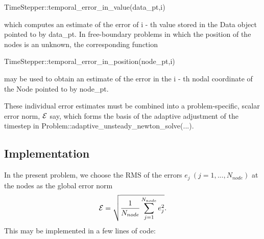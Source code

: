 \begin{DoxyCode}
TimeStepper::temporal\_error\_in\_value(data\_pt,i)
\end{DoxyCode}


which computes an estimate of the error of {\ttfamily i} -\/ th value stored in the {\ttfamily Data} object pointed to by {\ttfamily data\+\_\+pt}. In free-\/boundary problems in which the position of the nodes is an unknown, the corresponding function


\begin{DoxyCode}
TimeStepper::temporal\_error\_in\_position(node\_pt,i)
\end{DoxyCode}


may be used to obtain an estimate of the error in the {\ttfamily i} -\/ th nodal coordinate of the {\ttfamily Node} pointed to by {\ttfamily node\+\_\+pt}.

These individual error estimates must be combined into a problem-\/specific, scalar error norm, ${\cal E}$ say, which forms the basis of the adaptive adjustment of the timestep in {\ttfamily Problem\+::adaptive\+\_\+unsteady\+\_\+newton\+\_\+solve}(...).\hypertarget{index_impl}{}\subsection{Implementation}\label{index_impl}
In the present problem, we choose the R\+MS of the errors $ e_j \ (j=1,...,N_{node})$ at the nodes as the global error norm \[ {\cal E} = \sqrt{ \frac{1}{N_{node}} \sum_{j=1}^{N_{node}} e_j^2 }. \] This may be implemented in a few lines of code\+:

